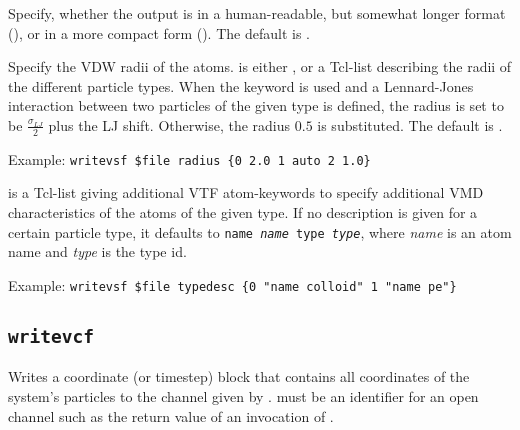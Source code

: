 \begin{arguments}
\item[\opt{<short|verbose>}]
  Specify, whether the output is in a human-readable, but somewhat
  longer format (), or in a more compact form
  (). The default is .
  
\item[\opt{radius <\var{radii}|auto>}]
  Specify the VDW radii of the atoms.  is either
  , or a Tcl-list describing the radii of the different
  particle types. When the keyword  is used and a
  Lennard-Jones interaction between two particles of the given type is
  defined, the radius is set to be $\frac{\sigma_{LJ}}{2}$ plus the LJ
  shift.  Otherwise, the radius $0.5$ is substituted. The default is
  .
  
  Example: \verb!writevsf $file radius {0 2.0 1 auto 2 1.0}!
  
\item[\opt{typedesc \var{typedesc}}]
   is a Tcl-list giving additional VTF atom-keywords to
  specify additional VMD characteristics of the atoms of the given type.
  If no description is given for a certain particle type, it defaults to
  \texttt{name \textit{name} type \textit{type}}, where \textit{name}
  is an atom name and \textit{type} is the type id.
  
  Example: \verb!writevsf $file typedesc {0 "name colloid" 1 "name pe"}!
\end{arguments}

\subsection{\texttt{writevcf}}
{  
  }

Writes a coordinate (or timestep) block that contains all coordinates
of the system's particles to the channel given by .
 must be an identifier for an open channel such as the
return value of an invocation of .

